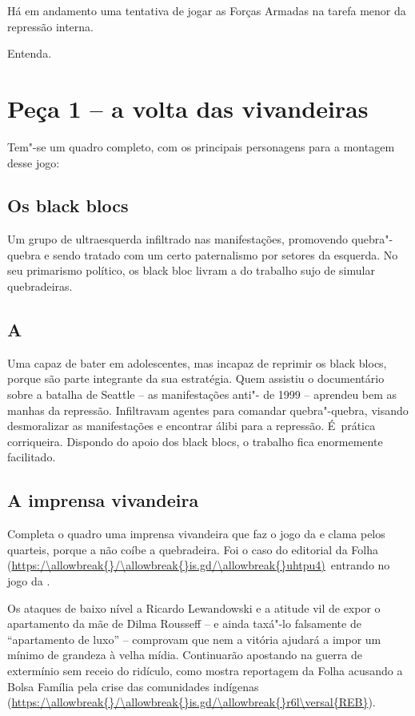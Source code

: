  

Há em andamento uma tentativa de jogar as Forças Armadas na tarefa menor
da repressão interna.

Entenda.

\section{Peça 1 -- a volta das vivandeiras}

Tem"-se um quadro completo, com os principais personagens para a montagem
desse jogo:

\subsection{Os black blocs}

Um grupo de ultraesquerda infiltrado nas manifestações, promovendo
quebra"-quebra e sendo tratado com um certo paternalismo por setores da
esquerda. No seu primarismo político, os black bloc livram a  do
trabalho sujo de simular quebradeiras.

\subsection{A }

Uma  capaz de bater em adolescentes, mas incapaz de reprimir os black
blocs, porque são parte integrante da sua estratégia. Quem assistiu o
documentário sobre a batalha de Seattle -- as manifestações anti"- de
1999 -- aprendeu bem as manhas da repressão. Infiltravam agentes para
comandar quebra"-quebra, visando desmoralizar as manifestações e
encontrar álibi para a repressão. É~prática corriqueira. Dispondo do
apoio dos black blocs, o trabalho fica enormemente facilitado.

 

\subsection{A imprensa vivandeira}

Completa o quadro uma imprensa vivandeira que faz o jogo da  e clama
pelos quarteis, porque a  não coíbe a quebradeira. Foi o caso do
editorial da Folha (\url{https:/\allowbreak{}/\allowbreak{}is.gd/\allowbreak{}uhtpu4)}~entrando no jogo da .

Os ataques de baixo nível a Ricardo Lewandowski e a atitude vil de expor
o apartamento da mãe de Dilma Rousseff -- e ainda taxá"-lo falsamente de
``apartamento de luxo'' -- comprovam que nem a vitória ajudará a impor
um mínimo de grandeza à velha mídia. Continuarão apostando na guerra de
extermínio sem receio do ridículo, como mostra reportagem da Folha
acusando a Bolsa Família pela crise das comunidades indígenas
(\url{https:/\allowbreak{}/\allowbreak{}is.gd/\allowbreak{}r6l\versal{REB}}).

